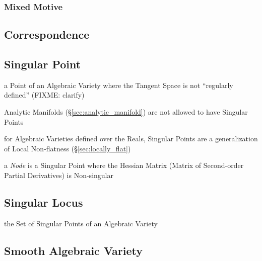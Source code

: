 \subsubsection{Mixed Motive}\label{sec:mixed_motive}



\subsection{Correspondence}\label{sec:variety_correspondence}

\subsection{Singular Point}\label{sec:singular_point}

a Point of an Algebraic Variety where the Tangent Space is not ``regularly
defined'' (FIXME: clarify)

Analytic Manifolds (\S\ref{sec:analytic_manifold}) are not allowed to have
Singular Points

for Algebraic Varieties defined over the Reals, Singular Points are a
generalization of Local Non-flatness (\S\ref{sec:locally_flat})

a \emph{Node} is a Singular Point where the Hessian Matrix (Matrix of
Second-order Partial Derivatives) is Non-singular



\subsection{Singular Locus}\label{sec:singular_locus}

the Set of Singular Points of an Algebraic Variety



\subsection{Smooth Algebraic Variety}\label{sec:smooth_variety}

